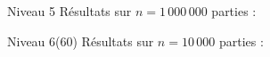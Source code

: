\begin{frame}{Niveau 5}
Résultats sur $n=1\,000\,000$ parties :
\begin{center}
\end{center}
\end{frame}

\begin{frame}{Niveau 6(60)}
Résultats sur $n=10\,000$ parties :
\begin{center}
\end{center}
\end{frame}

